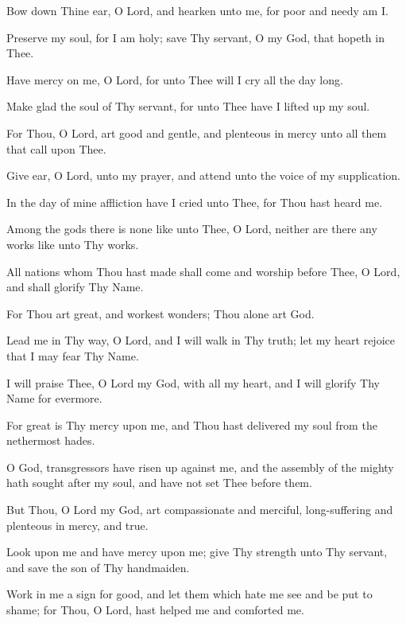 Bow down Thine ear, O Lord, and hearken unto me, for poor and needy am I.

Preserve my soul, for I am holy; save Thy servant, O my God, that hopeth in Thee.

Have mercy on me, O Lord, for unto Thee will I cry all the day long.

Make glad the soul of Thy servant, for unto Thee have I lifted up my soul.

For Thou, O Lord, art good and gentle, and plenteous in mercy unto all them that call upon Thee.

Give ear, O Lord, unto my prayer, and attend unto the voice of my supplication.

In the day of mine affliction have I cried unto Thee, for Thou hast heard me.

Among the gods there is none like unto Thee, O Lord, neither are there any works like unto Thy works.

All nations whom Thou hast made shall come and worship before Thee, O Lord, and shall glorify Thy Name.

For Thou art great, and workest wonders; Thou alone art God.

Lead me in Thy way, O Lord, and I will walk in Thy truth; let my heart rejoice that I may fear Thy Name.

I will praise Thee, O Lord my God, with all my heart, and I will glorify Thy Name for evermore.

For great is Thy mercy upon me, and Thou hast delivered my soul from the nethermost hades.

O God, transgressors have risen up against me, and the assembly of the mighty hath sought after my soul, and have not set Thee before them.

But Thou, O Lord my God, art compassionate and merciful, long-suffering and plenteous in mercy, and true.

Look upon me and have mercy upon me; give Thy strength unto Thy servant, and save the son of Thy handmaiden.

Work in me a sign for good, and let them which hate me see and be put to shame; for Thou, O Lord, hast helped me and comforted me.
